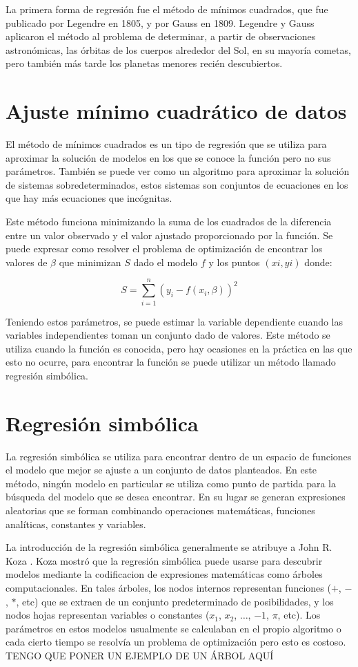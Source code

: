 La primera forma de regresión fue el método de mínimos cuadrados, que fue publicado por Legendre en 1805, y por Gauss en 1809. Legendre y Gauss aplicaron el método al problema de determinar, a partir de observaciones astronómicas, las órbitas de los cuerpos alrededor del Sol, en su mayoría cometas, pero también más tarde los planetas menores recién descubiertos.

\section{Ajuste mínimo cuadrático de datos}

El método de mínimos cuadrados es un tipo de regresión que se utiliza para aproximar la solución de modelos en los que se conoce la función pero no sus parámetros. También se puede ver como un algoritmo para aproximar la solución de sistemas sobredeterminados, estos sistemas son conjuntos de ecuaciones en los que hay más ecuaciones que incógnitas.

Este método funciona minimizando la suma de los cuadrados de la diferencia entre un valor observado y el valor ajustado proporcionado por la función. Se puede expresar como resolver el problema de optimización de encontrar los valores de $\beta$ que minimizan $S$ dado el modelo $f$ y los puntos $(xi, yi)$ donde:

$$S = \sum_{i=1}^{n}(y_i - f(x_i, \beta))^2$$

Teniendo estos parámetros, se puede estimar la variable dependiente cuando las variables independientes toman un conjunto dado de valores. Este método se utiliza cuando la función es conocida, pero hay ocasiones en la práctica en las que esto no ocurre, para encontrar la función se puede utilizar un método llamado regresión simbólica.

\section{Regresión simbólica}

La regresión simbólica se utiliza para encontrar dentro de un espacio de funciones el modelo que mejor se ajuste a un conjunto de datos planteados. En este método, ningún modelo en particular se utiliza como punto de partida para la búsqueda del modelo que se desea encontrar. En su lugar se generan expresiones aleatorias que se forman combinando operaciones matemáticas, funciones analíticas, constantes y variables.

La introducción de la regresión simbólica generalmente se atribuye a John R. Koza \cite{zelinka2005analytic}. Koza mostró que la regresión simbólica puede usarse para descubrir modelos mediante la codificacion de expresiones matemáticas como árboles computacionales. En tales árboles, los nodos internos representan funciones ($+$, $-$, $*$, etc) que se extraen de un conjunto predeterminado de posibilidades, y los nodos hojas representan variables o constantes ($x_1$, $x_2$, $\dots$, $-1$, $\pi$, etc). Los parámetros en estos modelos usualmente se calculaban en el propio algoritmo o cada cierto tiempo se resolvía un problema de optimización pero esto es costoso. TENGO QUE PONER UN EJEMPLO DE UN ÁRBOL AQUÍ

